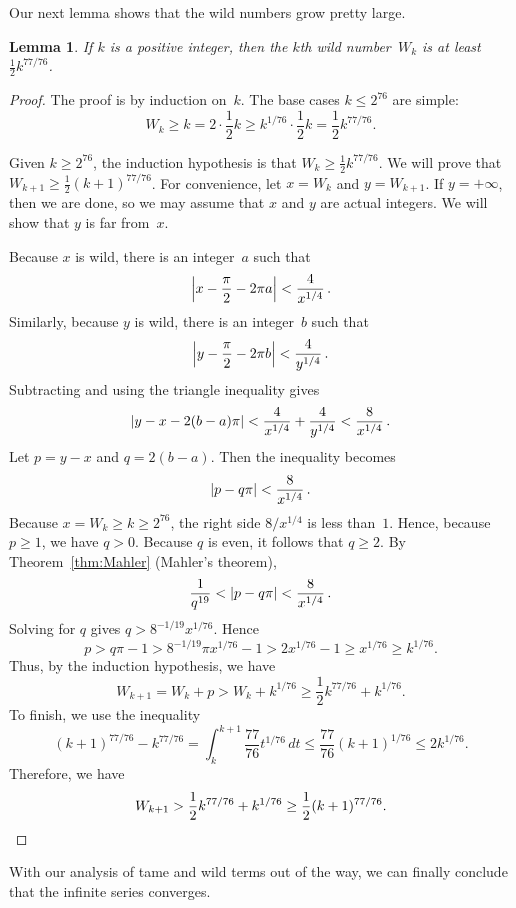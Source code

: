 \documentclass[12pt]{article}
\theoremstyle{plain}
\newtheorem{lemma}[theorem]{Lemma}
\DeclarePairedDelimiter\abs{\lvert}{\rvert}
\begin{document}
Our next lemma shows that the wild numbers grow pretty large.  

\begin{lemma} \label{lemma:wild}
If $k$ is a positive integer, 
then the $k$th wild number~$W_k$ is at least~$\frac{1}{2} k^{77/76}$.
\end{lemma}

\begin{proof}
The proof is by induction on~$k$.
The base cases $k \le 2^{76}$ are simple:
\[
  W_k 
	  \ge k
		= 2 \cdot \frac{1}{2} k
		\ge k^{1/76} \cdot \frac{1}{2} k
		= \frac{1}{2} k^{77/76} .
\]

Given $k \ge 2^{76}$,
the induction hypothesis is that $W_k \ge \frac{1}{2} k^{77/76}$.
We will prove that $W_{k + 1} \ge \frac{1}{2} (k + 1)^{77/76}$.
For convenience, let $x = W_k$ and $y = W_{k + 1}$.
If $y = +\infty$, then we are done, so we may assume that $x$ and $y$ are actual integers.  
We will show that $y$ is far from~$x$.  

Because $x$ is wild, there is an integer~$a$ such that 
\[
  \abs[\Big]{ x - \frac{\pi}{2} - 2 \pi a } < \frac{4}{x^{1/4}} \, .
\]
Similarly, because $y$ is wild, there is an integer~$b$ such that 
\[
  \abs[\Big]{ y - \frac{\pi}{2} - 2 \pi b } 
	  < \frac{4}{y^{1/4}} \, .
\]
Subtracting and using the triangle inequality gives
\[
  \abs{y - x - 2 (b - a) \pi} 
	  < \frac{4}{x^{1/4}} + \frac{4}{y^{1/4}}
		< \frac{8}{x^{1/4}} \, .
\]
Let $p = y - x$ and $q = 2(b - a)$. 
Then the inequality becomes
\[
  \abs{p - q \pi} < \frac{8}{x^{1/4}} \, .
\]
Because $x = W_k \ge k \ge 2^{76}$,
the right side $8 / x^{1/4}$ is less than~$1$.  
Hence, because $p \ge 1$, we have $q > 0$.
Because $q$ is even, it follows that $q \ge 2$.      
By Theorem~\ref{thm:Mahler} (Mahler's theorem), 
\[
  \frac{1}{q^{19}} < \abs{p - q \pi} < \frac{8}{x^{1/4}}  \, .
\]
Solving for $q$ gives $q > 8^{-1/19} x^{1/76}$.
Hence 
\[
  p > q \pi - 1 > 8^{-1/19} \pi x^{1/76} - 1 > 2 x^{1/76} - 1 \ge x^{1/76} \ge k^{1/76}. 
\]
Thus, by the induction hypothesis, we have
\[
  W_{k+1} = W_k + p > W_k + k^{1/76} \ge \frac{1}{2} k^{77/76} + k^{1/76} .
\]
To finish, we use the inequality
\[
  (k + 1)^{77/76} - k^{77/76}
	  = \int_{k}^{k+1} \frac{77}{76} t^{1/76} \, dt
		\le \frac{77}{76} (k + 1)^{1/76}
		\le 2 k^{1/76} .
\]
Therefore, we have
\[
  W_{k + 1} 
	  > \frac{1}{2} k^{77/76} + k^{1/76}
		\ge \frac{1}{2} (k + 1)^{77/76} .   \qedhere
\]
\end{proof}

With our analysis of tame and wild terms out of the way, 
we can finally conclude that the infinite series converges.  
\end{document}
